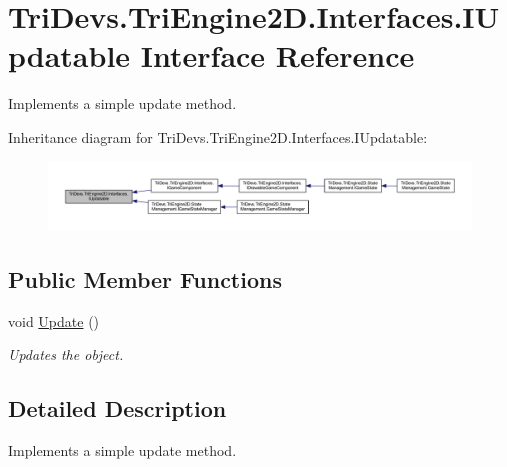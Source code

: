 \hypertarget{interface_tri_devs_1_1_tri_engine2_d_1_1_interfaces_1_1_i_updatable}{\section{Tri\-Devs.\-Tri\-Engine2\-D.\-Interfaces.\-I\-Updatable Interface Reference}
\label{interface_tri_devs_1_1_tri_engine2_d_1_1_interfaces_1_1_i_updatable}
}


Implements a simple update method.  




Inheritance diagram for Tri\-Devs.\-Tri\-Engine2\-D.\-Interfaces.\-I\-Updatable\-:
\nopagebreak
\begin{figure}[H]
\begin{center}
\leavevmode
\includegraphics[width=350pt]{interface_tri_devs_1_1_tri_engine2_d_1_1_interfaces_1_1_i_updatable__inherit__graph}
\end{center}
\end{figure}
\subsection*{Public Member Functions}
\begin{DoxyCompactItemize}
\item 
void \hyperlink{interface_tri_devs_1_1_tri_engine2_d_1_1_interfaces_1_1_i_updatable_a01e54ce26f078bffd4434aca86e2a7e4}{Update} ()
\begin{DoxyCompactList}\small\item\em Updates the object. \end{DoxyCompactList}\end{DoxyCompactItemize}


\subsection{Detailed Description}
Implements a simple update method. 



